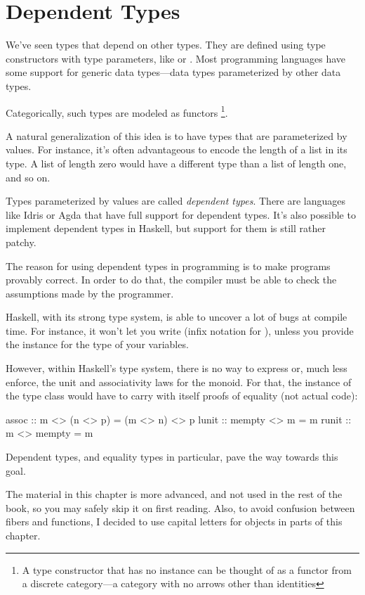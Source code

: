 \documentclass[DaoFP]{subfiles}
\begin{document}
\setcounter{chapter}{10}

\chapter{Dependent Types}

We've seen types that depend on other types. They are defined using type constructors with type parameters, like  or \hask{[]}. Most programming languages have some support for generic data types---data types parameterized by other data types.

Categorically, such types are modeled as functors \footnote{A type constructor that has no  instance can be thought of as a functor from a discrete category---a category with no arrows other than identities}.

A natural generalization of this idea is to have types that are parameterized by values. For instance, it's often advantageous to encode the length of a list in its type. A list of length zero would have a different type than a list of length one, and so on. 

Types parameterized by values are called \emph{dependent types}. There are languages like Idris or Agda that have full support for dependent types. It's also possible to implement dependent types in Haskell, but support for them is still rather patchy. 

The reason for using dependent types in programming is to make programs provably correct. In order to do that, the compiler must be able to check the assumptions made by the programmer. 

Haskell, with its strong type system, is able to uncover a lot of bugs at compile time. For instance, it won't let you write  (infix notation for ), unless you provide the  instance for the type of your variables. 

However, within Haskell's type system, there is no way to express or, much less enforce, the unit and associativity laws for the monoid. For that, the instance of the  type class would have to carry with itself proofs of equality (not actual code):
\begin{haskell}
assoc :: m <> (n <> p) = (m <> n) <> p
lunit :: mempty <> m = m
runit :: m <> mempty = m
\end{haskell}
Dependent types, and equality types in particular, pave the way towards this goal.

The material in this chapter is more advanced, and not used in the rest of the book, so you may safely skip it on first reading. Also, to avoid confusion between fibers and functions, I decided to use capital letters for objects in parts of this chapter.
\end{document}

